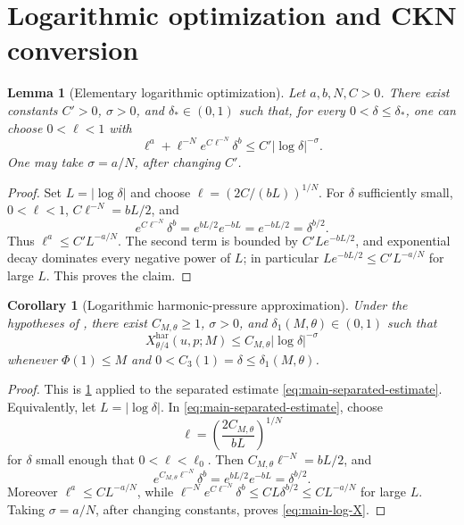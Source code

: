 \documentclass[11pt]{article}
\numberwithin{equation}{section}
\theoremstyle{plain}
\newtheorem{lemma}{Lemma}[section]
\newtheorem{corollary}{Corollary}[section]
\theoremstyle{definition}
\theoremstyle{remark}
\newcommand{\har}{\mathrm{har}}
\begin{document}
\section{Logarithmic optimization and CKN conversion}\label{sec:main-log-ckn}

\begin{lemma}[Elementary logarithmic optimization]\label{lem:main-log-optimization}
Let \(a,b,N,C>0\).  There exist constants \(C'>0\), \(\sigma>0\), and \(\delta_*\in(0,1)\) such that, for every \(0<\delta\le\delta_*\), one can choose \(0<\ell<1\) with
\[
        \ell^a+\ell^{-N}e^{C\ell^{-N}}\delta^b
        \le C'|\log\delta|^{-\sigma}.
\]
One may take \(\sigma=a/N\), after changing \(C'\).
\end{lemma}

\begin{proof}
Set \(L=|\log\delta|\) and choose \(\ell=(2C/(bL))^{1/N}\).  For \(\delta\) sufficiently small, \(0<\ell<1\), \(C\ell^{-N}=bL/2\), and
\[
        e^{C\ell^{-N}}\delta^b=e^{bL/2}e^{-bL}=e^{-bL/2}=\delta^{b/2}.
\]
Thus \(\ell^a\le C'L^{-a/N}\).  The second term is bounded by \(C'L e^{-bL/2}\), and exponential decay dominates every negative power of \(L\); in particular \(L e^{-bL/2}\le C'L^{-a/N}\) for large \(L\).  This proves the claim.
\end{proof}

\begin{corollary}[Logarithmic harmonic-pressure approximation]\label{cor:main-log-approx}
Under the hypotheses of , there exist \(C_{M,\theta}\ge1\), \(\sigma>0\), and \(\delta_1(M,\theta)\in(0,1)\) such that
\begin{equation}\label{eq:main-log-X}
        X^{\har}_{\theta/4}(u,p;M)
        \le C_{M,\theta}|\log\delta|^{-\sigma}
\end{equation}
whenever \(\Phi(1)\le M\) and \(0<C_3(1)=\delta\le\delta_1(M,\theta)\).
\end{corollary}

\begin{proof}
This is \cref{lem:main-log-optimization} applied to the separated estimate \eqref{eq:main-separated-estimate}.  Equivalently, let \(L=|\log\delta|\).  In \eqref{eq:main-separated-estimate}, choose
\[
        \ell=\left(\frac{2C_{M,\theta}}{bL}\right)^{1/N}
\]
for \(\delta\) small enough that \(0<\ell<\ell_0\).  Then \(C_{M,\theta}\ell^{-N}=bL/2\), and
\[
        e^{C_{M,\theta}\ell^{-N}}\delta^b=e^{bL/2}e^{-bL}=\delta^{b/2}.
\]
Moreover \(\ell^a\le C L^{-a/N}\), while \(\ell^{-N}e^{C\ell^{-N}}\delta^b\le C L\delta^{b/2}\le C L^{-a/N}\) for large \(L\).  Taking \(\sigma=a/N\), after changing constants, proves \eqref{eq:main-log-X}.
\end{proof}
\end{document}

